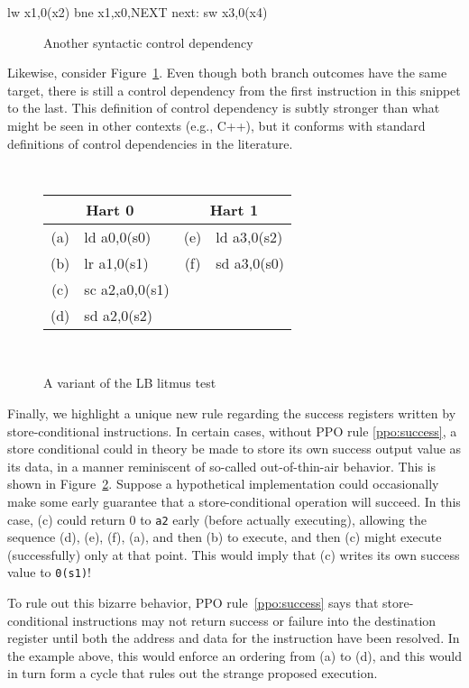 \begin{verbbox}
        lw  x1,0(x2)
        bne x1,x0,NEXT
  next: sw  x3,0(x4)
\end{verbbox}
\begin{figure}[h!]
  \centering\small
  \theverbbox
  \caption{Another syntactic control dependency}
  \label{fig:litmus:control2}
\end{figure}

Likewise, consider Figure~\ref{fig:litmus:control2}.
Even though both branch outcomes have the same target, there is still a control dependency from the first instruction in this snippet to the last.
This definition of control dependency is subtly stronger than what might be seen in other contexts (e.g., C++), but it conforms with standard definitions of control dependencies in the literature.

\begin{figure}[h!]
  \center
  {
    \tt\small
    \begin{tabular}{cl||cl}
    \multicolumn{2}{c}{Hart 0} & \multicolumn{2}{c}{Hart 1} \\
    \hline
      (a) & ld a0,0(s0)    & (e) & ld a3,0(s2) \\
      (b) & lr a1,0(s1)    & (f) & sd a3,0(s0) \\
      (c) & sc a2,a0,0(s1) &                    \\
      (d) & sd a2,0(s2)    &                    \\
    \end{tabular}
  }
  ~~~~
  \diagram
  \caption{A variant of the LB litmus test}
  \label{fig:litmus:successdeps}
\end{figure}

Finally, we highlight a unique new rule regarding the success registers written by store-conditional instructions.
In certain cases, without PPO rule \ref{ppo:success}, a store conditional could in theory be made to store its own success output value as its data, in a manner reminiscent of so-called out-of-thin-air behavior.
This is shown in Figure~\ref{fig:litmus:successdeps}.
Suppose a hypothetical implementation could occasionally make some early guarantee that a store-conditional operation will succeed.
In this case, (c) could return 0 to {\tt a2} early (before actually executing), allowing the sequence (d), (e), (f), (a), and then (b) to execute, and then (c) might execute (successfully) only at that point.
This would imply that (c) writes its own success value to {\tt 0(s1)}!

To rule out this bizarre behavior, PPO rule~\ref{ppo:success} says that store-conditional instructions may not return success or failure into the destination register until both the address and data for the instruction have been resolved.
In the example above, this would enforce an ordering from (a) to (d), and this would in turn form a cycle that rules out the strange proposed execution.

